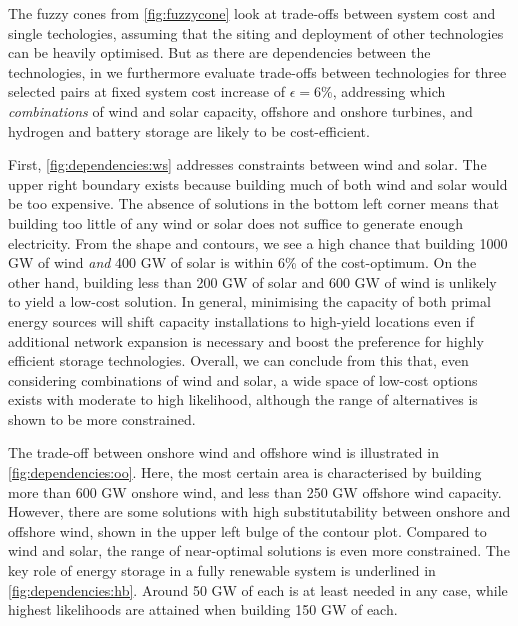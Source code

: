 The fuzzy cones from \cref{fig:fuzzycone} look at trade-offs between system cost
and single techologies, assuming that the siting and deployment of other
technologies can be heavily optimised. But as there are dependencies between the
technologies, in  we
furthermore evaluate trade-offs between technologies for three selected pairs at
fixed system cost increase of $\epsilon=6\%$, addressing which
\textit{combinations} of wind and solar capacity, offshore and onshore turbines,
and hydrogen and battery storage are likely to be cost-efficient.

First, \cref{fig:dependencies:ws} addresses constraints between wind and solar.
The upper right boundary exists because building much of both wind and solar
would be too expensive. The absence of solutions in the bottom left corner means
that building too little of any wind or solar does not suffice to generate
enough electricity. From the shape and contours, we see a high chance that
building 1000 GW of wind \textit{and} 400 GW of solar is within 6\% of the
cost-optimum. On the other hand, building less than 200 GW of solar and 600 GW
of wind is unlikely to yield a low-cost solution. In general, minimising the
capacity of both primal energy sources will shift capacity installations to
high-yield locations even if additional network expansion is necessary and boost
the preference for highly efficient storage technologies. Overall, we can
conclude from this that, even considering combinations of wind and solar, a wide
space of low-cost options exists with moderate to high likelihood, although the
range of alternatives is shown to be more constrained.

The trade-off between onshore wind and offshore wind is illustrated in
\cref{fig:dependencies:oo}. Here, the most certain area is characterised by
building more than 600 GW onshore wind, and less than 250 GW offshore wind
capacity. However, there are some solutions with high substitutability between
onshore and offshore wind, shown in the upper left bulge of the contour plot.
Compared to wind and solar, the range of near-optimal solutions is even more
constrained. The key role of energy storage in a fully renewable system is
underlined in \cref{fig:dependencies:hb}. Around 50 GW of each is at least
needed in any case, while highest likelihoods are attained when building 150 GW
of each.


